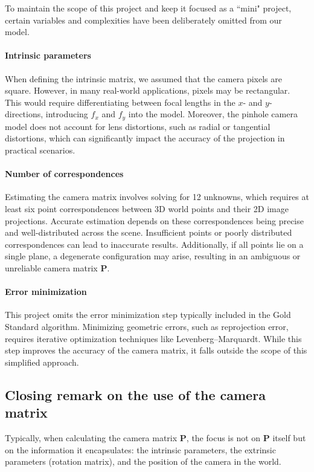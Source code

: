 \documentclass[12pt]{article}
\begin{document}
To maintain the scope of this project and keep it focused as a ``mini" project, certain variables and complexities have been deliberately omitted from our model.

\paragraph{Intrinsic parameters} When defining the intrinsic matrix, we assumed that the camera pixels are square. However, in many real-world applications, pixels may be rectangular. This would require differentiating between focal lengths in the \( x \)- and \( y \)-directions, introducing \( f_x \) and \( f_y \) into the model. Moreover, the pinhole camera model does not account for lens distortions, such as radial or tangential distortions, which can significantly impact the accuracy of the projection in practical scenarios.

\paragraph{Number of correspondences} Estimating the camera matrix involves solving for 12 unknowns, which requires at least six point correspondences between 3D world points and their 2D image projections. Accurate estimation depends on these correspondences being precise and well-distributed across the scene. Insufficient points or poorly distributed correspondences can lead to inaccurate results. Additionally, if all points lie on a single plane, a degenerate configuration may arise, resulting in an ambiguous or unreliable camera matrix \( \mathbf{P} \).

\paragraph{Error minimization} This project omits the error minimization step typically included in the Gold Standard algorithm. Minimizing geometric errors, such as reprojection error, requires iterative optimization techniques like Levenberg--Marquardt. While this step improves the accuracy of the camera matrix, it falls outside the scope of this simplified approach.

\subsection{Closing remark on the use of the camera matrix}

Typically, when calculating the camera matrix \( \mathbf{P} \), the focus is not on \( \mathbf{P} \) itself but on the information it encapsulates: the intrinsic parameters, the extrinsic parameters (rotation matrix), and the position of the camera in the world.
\end{document}

